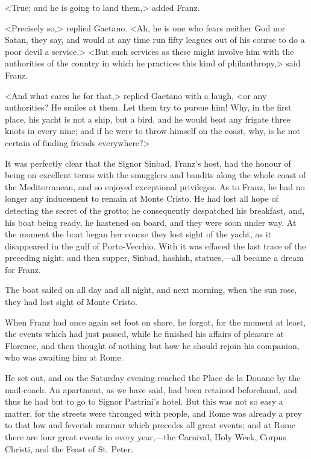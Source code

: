  <True; and he is going to land them,> added Franz. 

 <Precisely so,> replied Gaetano. <Ah, he is one who fears neither God nor Satan, they say, and would at any time run fifty leagues out of his course to do a poor devil a service.>  <But such services as these might involve him with the authorities of the country in which he practices this kind of philanthropy,> said Franz. 

 <And what cares he for that,> replied Gaetano with a laugh, <or any authorities? He smiles at them. Let them try to pursue him! Why, in the first place, his yacht is not a ship, but a bird, and he would beat any frigate three knots in every nine; and if he were to throw himself on the coast, why, is he not certain of finding friends everywhere?> 

 It was perfectly clear that the Signor Sinbad, Franz's host, had the honour of being on excellent terms with the smugglers and bandits along the whole coast of the Mediterranean, and so enjoyed exceptional privileges. As to Franz, he had no longer any inducement to remain at Monte Cristo. He had lost all hope of detecting the secret of the grotto; he consequently despatched his breakfast, and, his boat being ready, he hastened on board, and they were soon under way. At the moment the boat began her course they lost sight of the yacht, as it disappeared in the gulf of Porto-Vecchio. With it was effaced the last trace of the preceding night; and then supper, Sinbad, hashish, statues,—all became a dream for Franz. 

 The boat sailed on all day and all night, and next morning, when the sun rose, they had lost sight of Monte Cristo. 

 When Franz had once again set foot on shore, he forgot, for the moment at least, the events which had just passed, while he finished his affairs of pleasure at Florence, and then thought of nothing but how he should rejoin his companion, who was awaiting him at Rome. 

 He set out, and on the Saturday evening reached the Place de la Douane by the mail-coach. An apartment, as we have said, had been retained beforehand, and thus he had but to go to Signor Pastrini's hotel. But this was not so easy a matter, for the streets were thronged with people, and Rome was already a prey to that low and feverish murmur which precedes all great events; and at Rome there are four great events in every year,—the Carnival, Holy Week, Corpus Christi, and the Feast of St. Peter. 

